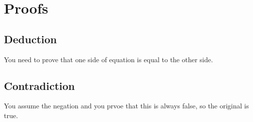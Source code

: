 \documentclass[../main.tex]{subfiles}
\begin{document}
\section{Proofs}

\subsection{Deduction}

You need to prove that one side of equation is equal to the other side.

\subsection{Contradiction}

You assume the negation and you prvoe that this is always false, so the original is true.
\end{document}
